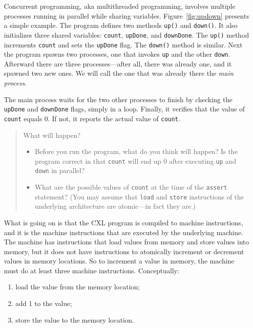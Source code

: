 \documentclass{book}
\begin{document}
Concurrent programming, aka multithreaded programming, involves multiple
processes running in parallel while sharing variables.
Figure~\ref{fig:updown} presents a simple example.  The program defines two
methods \texttt{up()} and \texttt{down()}.
It also initializes three shared
variables: \texttt{count}, \texttt{upDone}, and \texttt{downDone}.
The \texttt{up()} method increments \texttt{count} and sets the \texttt{upDone}
flag.  The \texttt{down()} method is similar.
Next the program spawns two processes, one that invokes \texttt{up} and the
other \texttt{down}.  Afterward there are three processes---after
all, there was already one, and it spawned two new ones.  We will call
the one that was already there the \emph{main process}.

The main process waits for the two other processes to finish by checking
the \texttt{upDone} and \texttt{downDone} flags, simply in a loop.
Finally, it verifies that the value of \texttt{count} equals 0.  If not,
it reports the actual value of \texttt{count}.

\begin{quote}
What will happen?
\begin{itemize}
\item Before you run the program, what do you think will happen?  Is the
program correct in that \texttt{count} will end up 0 after executing
\texttt{up} and \texttt{down} in parallel?
\item What are the possible values of \texttt{count} at the time of the
\texttt{assert} statement?
(You may assume that \texttt{load} and \texttt{store} instructions of the
underlying architecture are atomic---in fact they are.)
\end{itemize}
\end{quote}

What is going on is that the CXL program is compiled to machine instructions,
and it is the machine instructions that are executed by the underlying
machine.  The machine has instructions that load values from memory and store
values into memory, but it does not have instructions to atomically increment
or decrement values in memory locations.  So to increment a value in memory,
the machine must do at least three machine instructions.  Conceptually:
\begin{enumerate}
\item load the value from the memory location;
\item add 1 to the value;
\item store the value to the memory location.
\end{enumerate}
\end{document}
